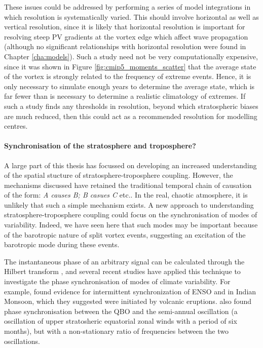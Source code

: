 These issues could be addressed by performing a series of model integrations in
which resolution is systematically varied. This should involve horizontal as
well as vertical resolution, since it is likely that horizontal resolution is
important for resolving steep PV gradients at the vortex edge which affect wave
propagation (although no significant relationships with horizontal resolution
were found in Chapter \ref{cha:models}). Such a study need not be very
computationally expensive, since it was shown in Figure
\ref{fig:cmip5_moments_scatter} that the average state of the vortex is strongly
related to the frequency of extreme events. Hence, it is only necessary to
simulate enough years to determine the average state, which is far fewer than is
necessary to determine a realistic climatology of extremes. If such a study
finds any thresholds in resolution, beyond which stratospheric biases are much
reduced, then this could act as a recommended resolution for modelling centres.


\paragraph{Synchronisation of the stratosphere and troposphere?} A large part of
this thesis has focussed on developing an increased understanding of the spatial
stucture of stratosphere-troposphere coupling. However, the mechanisms discussed
have retained the traditional temporal chain of causation of the form: \emph{A
  causes B; B casues C} etc.. In the real, chaotic atmosphere, it is unlikely
that such a simple mechanism exists. A new approach to understanding
stratosphere-troposphere coupling could focus on the synchronisation of modes of
variability. Indeed, we have seen here that such modes may be important because
of the barotropic nature of split vortex events, suggesting an excitation of the
barotropic mode during these events.

The instantaneous phase of an arbitrary signal can be calculated through the
Hilbert transform \citep{Pikovsky2001}, and several recent studies have applied
this technique to investigate the phase synchronisation of modes of climate
variability. For example, \citet{Maraun2005} found evidence for intermittent
synchronization of ENSO and in Indian Monsoon, which they suggested were
initiated by volcanic eruptions. \citet{Read2012} also found phase
synchronisation between the QBO and the semi-annual oscillation (a oscillation
of upper stratosheric equatorial zonal winds with a period of six months), but
with a non-stationary ratio of frequencies between the two oscillations.

